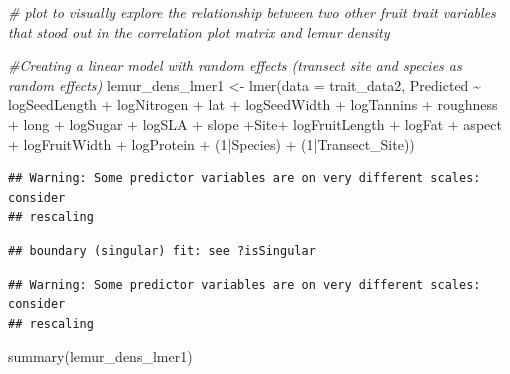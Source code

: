 \documentclass[
  12pt,
]{article}
\newenvironment{Shaded}{\begin{snugshade}}{\end{snugshade}}
\newcommand{\AttributeTok}[1]{\textcolor[rgb]{0.77,0.63,0.00}{#1}}
\newcommand{\CommentTok}[1]{\textcolor[rgb]{0.56,0.35,0.01}{\textit{#1}}}
\newcommand{\DecValTok}[1]{\textcolor[rgb]{0.00,0.00,0.81}{#1}}
\newcommand{\FunctionTok}[1]{\textcolor[rgb]{0.00,0.00,0.00}{#1}}
\newcommand{\NormalTok}[1]{#1}
\newcommand{\OtherTok}[1]{\textcolor[rgb]{0.56,0.35,0.01}{#1}}
\newcommand{\SpecialCharTok}[1]{\textcolor[rgb]{0.00,0.00,0.00}{#1}}
\begin{document}
\begin{Shaded}
\begin{Highlighting}[]
\CommentTok{\# plot to visually explore the relationship between two other fruit trait variables that stood out in the correlation plot matrix and lemur density}

\CommentTok{\#Creating a linear model with random effects (transect site and species as random effects)}
\NormalTok{lemur\_dens\_lmer1 }\OtherTok{\textless{}{-}} \FunctionTok{lmer}\NormalTok{(}\AttributeTok{data =}\NormalTok{ trait\_data2, Predicted }\SpecialCharTok{\textasciitilde{}}\NormalTok{ logSeedLength }\SpecialCharTok{+}\NormalTok{ logNitrogen }\SpecialCharTok{+}\NormalTok{ lat }\SpecialCharTok{+}\NormalTok{ logSeedWidth }\SpecialCharTok{+}\NormalTok{ logTannins }\SpecialCharTok{+}\NormalTok{ roughness }\SpecialCharTok{+}\NormalTok{ long }\SpecialCharTok{+}\NormalTok{ logSugar }\SpecialCharTok{+}\NormalTok{ logSLA }\SpecialCharTok{+}\NormalTok{ slope }\SpecialCharTok{+}\NormalTok{Site}\SpecialCharTok{+}\NormalTok{ logFruitLength }\SpecialCharTok{+}\NormalTok{ logFat }\SpecialCharTok{+}\NormalTok{ aspect }\SpecialCharTok{+}\NormalTok{ logFruitWidth }\SpecialCharTok{+}\NormalTok{ logProtein }\SpecialCharTok{+}\NormalTok{ (}\DecValTok{1}\SpecialCharTok{|}\NormalTok{Species) }\SpecialCharTok{+}\NormalTok{ (}\DecValTok{1}\SpecialCharTok{|}\NormalTok{Transect\_Site))}
\end{Highlighting}
\end{Shaded}

\begin{verbatim}
## Warning: Some predictor variables are on very different scales: consider
## rescaling
\end{verbatim}

\begin{verbatim}
## boundary (singular) fit: see ?isSingular
\end{verbatim}

\begin{verbatim}
## Warning: Some predictor variables are on very different scales: consider
## rescaling
\end{verbatim}

\begin{Shaded}
\begin{Highlighting}[]
\FunctionTok{summary}\NormalTok{(lemur\_dens\_lmer1)}
\end{Highlighting}
\end{Shaded}
\end{document}
